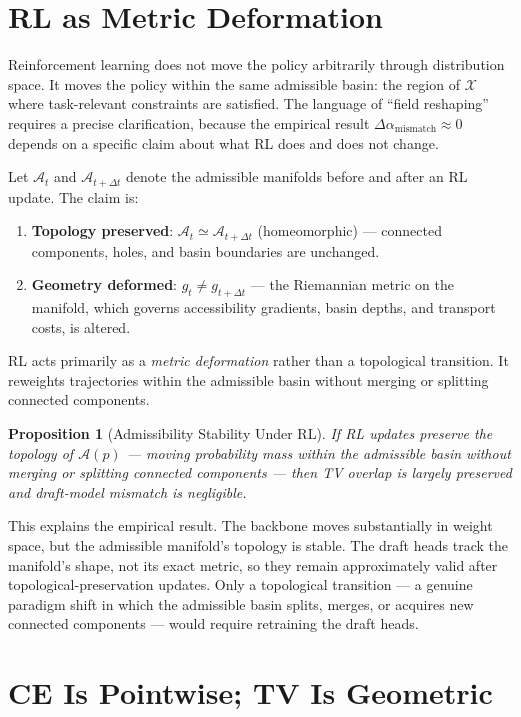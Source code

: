 \documentclass[11pt, a4paper, openany]{book}
\theoremstyle{plain}
\newtheorem{proposition}[theorem]{Proposition}
\theoremstyle{definition}
\theoremstyle{remark}
\begin{document}
\section{RL as Metric Deformation}

Reinforcement learning does not move the policy arbitrarily through
distribution space.
It moves the policy within the same admissible basin: the region of
$\mathcal{X}$ where task-relevant constraints are satisfied.
The language of ``field reshaping'' requires a precise clarification,
because the empirical result $\Delta\alpha_{\mathrm{mismatch}} \approx 0$
depends on a specific claim about what RL does and does not change.

Let $\mathcal{A}_t$ and $\mathcal{A}_{t+\Delta t}$ denote the admissible
manifolds before and after an RL update.
The claim is:
\begin{enumerate}
  \item \textbf{Topology preserved}: $\mathcal{A}_t \simeq \mathcal{A}_{t+\Delta t}$
    (homeomorphic) --- connected components, holes, and basin boundaries are unchanged.
  \item \textbf{Geometry deformed}: $g_t \neq g_{t+\Delta t}$ ---
    the Riemannian metric on the manifold, which governs accessibility gradients,
    basin depths, and transport costs, is altered.
\end{enumerate}
RL acts primarily as a \emph{metric deformation} rather than a topological transition.
It reweights trajectories within the admissible basin without merging or splitting
connected components.

\begin{proposition}[Admissibility Stability Under RL]
  If RL updates preserve the topology of $\mathcal{A}(p)$ ---
  moving probability mass within the admissible basin without
  merging or splitting connected components ---
  then TV overlap is largely preserved and draft-model mismatch is negligible.
\end{proposition}

This explains the empirical result.
The backbone moves substantially in weight space, but the admissible manifold's
topology is stable.
The draft heads track the manifold's shape, not its exact metric, so they
remain approximately valid after topological-preservation updates.
Only a topological transition --- a genuine paradigm shift in which the
admissible basin splits, merges, or acquires new connected components ---
would require retraining the draft heads.

\section{CE Is Pointwise; TV Is Geometric}
\end{document}
